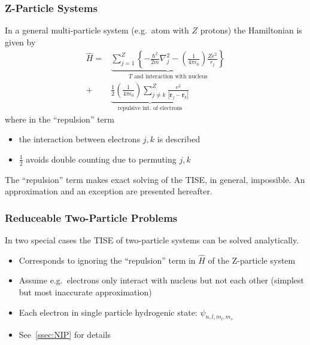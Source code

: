 \subsubsection{Z-Particle Systems}
In a general multi-particle system (e.g.\ atom with $Z$ protons) the Hamiltonian is given by
\begin{align*}
    \widehat{H} = & \underbrace{\sum_{j=1}^{Z}\left\{-\frac{\hbar^{2}}{2m}\nabla_{j}^{2}-\left(\frac{1}{4\pi \epsilon_{0}}\right)\frac{Ze^{2}}{r_{j}}\right\}}_{T\text{ and interaction with nucleus}} \\
    +             & \underbrace{\frac{1}{2}\left(\frac{1}{4\pi \epsilon_{0}}\right)\sum_{j\neq k}^{Z}\frac{e^{2}}{\left|\mathbf{r}_{j}-\mathbf{r}_{k}\right|}}_{\text{repulsive int.\ of electrons}}
\end{align*}
where in the ``repulsion'' term
\begin{itemize}
    \item the interaction between electrons $j,k$ is described
    \item $\frac{1}{2}$ avoids double counting due to permuting $j,k$
\end{itemize}
The ``repulsion'' term makes exact solving of the TISE, in general, impossible. An approximation and an exception are presented hereafter.

\subsubsection{Reduceable Two-Particle Problems}
In two special cases the TISE of two-particle systems can be solved analytically.

\newpar{}

\begin{itemize}
    \item Corresponds to ignoring the ``repulsion'' term in $\widehat{H}$ of the Z-particle system
    \item Assume e.g.\ electrons only interact with nucleus but not each other (simplest but most inaccurate approximation)
    \item Each electron in single particle hydrogenic state: $\psi_{n,l,m_l,m_s}$
    \item See~\ref{ssec:NIP} for details
\end{itemize}

\newpar{}

